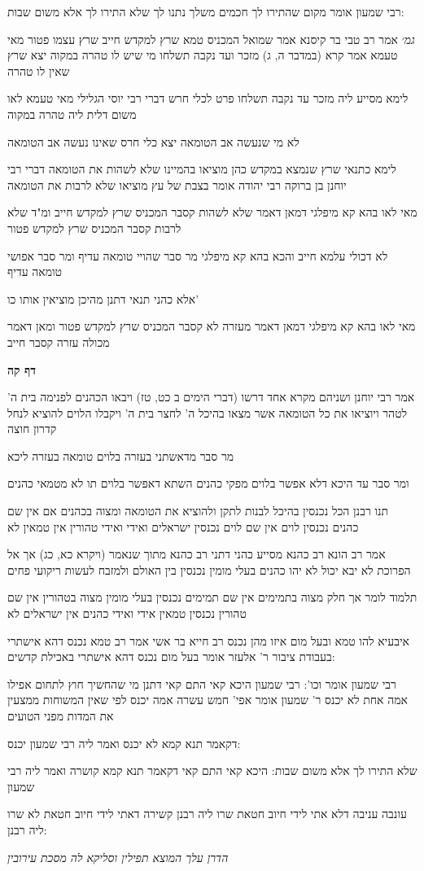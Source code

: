 \documentclass[12pt, openany]{book}
\newcommand{\sethebfont}{
\fontsize{10.5pt}{21.0pt} \selectfont
}
\newcommand{\textblock}[1]{
{\sethebfont #1\\}	
}
\newcommand{\sectname}{}
\newcommand{\newsection}[1]{
	\addcontentsline{toc}{section}{#1}
	\renewcommand{\sectname}{#1}	
	\vspace{-\baselineskip}
	\begin{center}
		\textbf{%
\fontsize{16pt}{16pt}\selectfont
			#1}
	\end{center}
	\vspace{-\baselineskip}
	\nopagebreak
}
\begin{document}
\textblock{רבי שמעון אומר מקום שהתירו לך חכמים משלך נתנו לך שלא התירו לך אלא משום שבות:}
\textblock{{\large\emph{גמ׳}} אמר רב טבי בר קיסנא אמר שמואל המכניס טמא שרץ למקדש חייב שרץ עצמו פטור מאי טעמא אמר קרא (במדבר ה, ג) מזכר ועד נקבה תשלחו מי שיש לו טהרה במקוה יצא שרץ שאין לו טהרה}
\textblock{לימא מסייע ליה מזכר עד נקבה תשלחו פרט לכלי חרש דברי רבי יוסי הגלילי מאי טעמא לאו משום דלית ליה טהרה במקוה}
\textblock{לא מי שנעשה אב הטומאה יצא כלי חרס שאינו נעשה אב הטומאה}
\textblock{לימא כתנאי שרץ שנמצא במקדש כהן מוציאו בהמיינו שלא לשהות את הטומאה דברי רבי יוחנן בן ברוקה רבי יהודה אומר בצבת של עץ מוציאו שלא לרבות את הטומאה}
\textblock{מאי לאו בהא קא מיפלגי דמאן דאמר שלא לשהות קסבר המכניס שרץ למקדש חייב ומ"ד שלא לרבות קסבר המכניס שרץ למקדש פטור}
\textblock{לא דכולי עלמא חייב והכא בהא קא מיפלגי מר סבר שהויי טומאה עדיף ומר סבר אפושי טומאה עדיף}
\textblock{אלא כהני תנאי דתנן מהיכן מוציאין אותו כו'}
\textblock{מאי לאו בהא קא מיפלגי דמאן דאמר מעזרה לא קסבר המכניס שרץ למקדש פטור ומאן דאמר מכולה עזרה קסבר חייב}
\newsection{דף קה}
\textblock{אמר רבי יוחנן ושניהם מקרא אחד דרשו (דברי הימים ב כט, טז) ויבאו הכהנים לפנימה בית ה' לטהר ויוציאו את כל הטומאה אשר מצאו בהיכל ה' לחצר בית ה' ויקבלו הלוים להוציא לנחל קדרון חוצה}
\textblock{מר סבר מדאשתני בעזרה בלוים טומאה בעזרה ליכא}
\textblock{ומר סבר עד היכא דלא אפשר בלוים מפקי כהנים השתא דאפשר בלוים תו לא מטמאי כהנים}
\textblock{תנו רבנן הכל נכנסין בהיכל לבנות לתקן ולהוציא את הטומאה ומצוה בכהנים אם אין שם כהנים נכנסין לוים אין שם לוים נכנסין ישראלים ואידי ואידי טהורין אין טמאין לא}
\textblock{אמר רב הונא רב כהנא מסייע כהני דתני רב כהנא מתוך שנאמר (ויקרא כא, כג) אך אל הפרוכת לא יבא יכול לא יהו כהנים בעלי מומין נכנסין בין האולם ולמזבח לעשות ריקועי פחים}
\textblock{תלמוד לומר אך חלק מצוה בתמימים אין שם תמימים נכנסין בעלי מומין מצוה בטהורין אין שם טהורין נכנסין טמאין אידי ואידי כהנים אין ישראלים לא}
\textblock{איבעיא להו טמא ובעל מום איזו מהן נכנס רב חייא בר אשי אמר רב טמא נכנס דהא אישתרי בעבודת ציבור ר' אלעזר אומר בעל מום נכנס דהא אישתרי באכילת קדשים:}
\textblock{רבי שמעון אומר וכו': רבי שמעון היכא קאי התם קאי דתנן מי שהחשיך חוץ לתחום אפילו אמה אחת לא יכנס ר' שמעון אומר אפי' חמש עשרה אמה יכנס לפי שאין המשוחות ממצעין את המדות מפני הטועים}
\textblock{דקאמר תנא קמא לא יכנס ואמר ליה רבי שמעון יכנס:}
\textblock{שלא התירו לך אלא משום שבות: היכא קאי התם קאי דקאמר תנא קמא קושרה ואמר ליה רבי שמעון}
\textblock{עונבה עניבה דלא אתי לידי חיוב חטאת שרו ליה רבנן קשירה דאתי לידי חיוב חטאת לא שרו ליה רבנן:}
\textblock{\par \par {\large\emph{הדרן עלך המוצא תפילין וסליקא לה מסכת עירובין}}\par \par }
\end{document}
